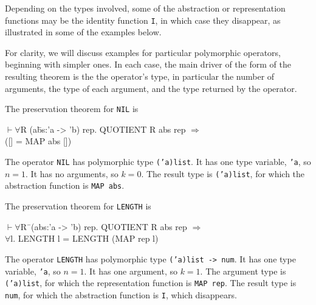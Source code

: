 \documentclass[envcountsame,runningheads]{llncs}
\begin{document}
Depending on the types involved, some 
of the abstraction or representation functions
may be the identity function {\tt I}, in which case they disappear,
as illustrated in some of the examples below.

For clarity, we will discuss examples for particular polymorphic operators,
beginning with simpler ones.
In each case, the main driver of the form of the resulting theorem is the 
the operator's type, in particular the number of arguments, the type of 
each argument, and the type returned by the operator.

The preservation theorem for {\tt NIL} is
{\tt \begin{tabbing}
\hspace{5.5mm}
    $\vdash \forall$R (a\=bs:'a -> 'b) rep. QUOTIENT R abs rep $\Rightarrow$ \\
\>          ([] = MAP abs [])
\end{tabbing}}
The operator {\tt NIL} has polymorphic type {\tt ('a)list}. 
It has one type variable, {\tt 'a}, so $n = 1$. 
It has no arguments, so $k = 0$.
The result type is
{\tt ('a)list},
for which
the abstraction function
is {\tt MAP abs}.

\pagebreak[2]
The preservation theorem for {\tt LENGTH} is
{\tt \begin{tabbing}
\hspace{5.5mm}
    $\vdash \forall$R\=\ (abs:'a -> 'b) rep. QUOTIENT R abs rep $\Rightarrow$ \\
\>       $\forall$l. LENGTH l = LENGTH (MAP rep l)
\end{tabbing}}
The operator {\tt LENGTH} has polymorphic type {\tt ('a)list -> num}. 
It has one type variable, {\tt 'a}, so $n = 1$. 
It has one argument, so $k = 1$.
The argument type is
{\tt ('a)list},
for which
the representation function
is {\tt MAP rep}.
The result type is
{\tt num},
for which
the abstraction function
is {\tt I}, which disappears.
\end{document}
